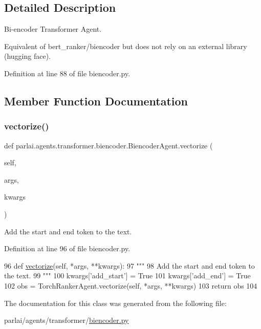 \subsection{Detailed Description}
\begin{DoxyVerb}Bi-encoder Transformer Agent.

Equivalent of bert_ranker/biencoder but does not rely on an external library
(hugging face).
\end{DoxyVerb}
 

Definition at line 88 of file biencoder.\+py.



\subsection{Member Function Documentation}
\mbox{\label{classparlai_1_1agents_1_1transformer_1_1biencoder_1_1BiencoderAgent_a0a75b68e9e6877358245f85bcb438d03}} 
\subsubsection{\texorpdfstring{vectorize()}{vectorize()}}
{\footnotesize\ttfamily def parlai.\+agents.\+transformer.\+biencoder.\+Biencoder\+Agent.\+vectorize (\begin{DoxyParamCaption}\item[{}]{self,  }\item[{}]{args,  }\item[{}]{kwargs }\end{DoxyParamCaption})}

\begin{DoxyVerb}Add the start and end token to the text.
\end{DoxyVerb}
 

Definition at line 96 of file biencoder.\+py.


\begin{DoxyCode}
96     \textcolor{keyword}{def }\hyperlink{namespaceparlai_1_1agents_1_1drqa_1_1utils_a5c76cc39e3014c7bcf9199d566dbdc0f}{vectorize}(self, *args, **kwargs):
97         \textcolor{stringliteral}{"""}
98 \textcolor{stringliteral}{        Add the start and end token to the text.}
99 \textcolor{stringliteral}{        """}
100         kwargs[\textcolor{stringliteral}{'add\_start'}] = \textcolor{keyword}{True}
101         kwargs[\textcolor{stringliteral}{'add\_end'}] = \textcolor{keyword}{True}
102         obs = TorchRankerAgent.vectorize(self, *args, **kwargs)
103         \textcolor{keywordflow}{return} obs
104 
\end{DoxyCode}


The documentation for this class was generated from the following file\+:\begin{DoxyCompactItemize}
\item 
parlai/agents/transformer/\hyperlink{biencoder_8py}{biencoder.\+py}\end{DoxyCompactItemize}
